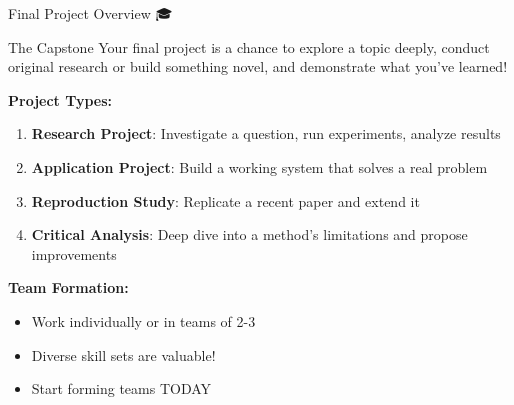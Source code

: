 \documentclass[aspectratio=169]{beamer}
\begin{document}
\begin{frame}[shrink=10]{Final Project Overview 🎓}
\begin{alertblock}{The Capstone}
Your final project is a chance to explore a topic deeply, conduct original research or build something novel, and demonstrate what you've learned!
\end{alertblock}

\vspace{0.5em}

\textbf{Project Types:}
\begin{enumerate}\setlength{\itemsep}{0pt}
    \item \textbf{Research Project}: Investigate a question, run experiments, analyze results
    \item \textbf{Application Project}: Build a working system that solves a real problem
    \item \textbf{Reproduction Study}: Replicate a recent paper and extend it
    \item \textbf{Critical Analysis}: Deep dive into a method's limitations and propose improvements
\end{enumerate}

\vspace{0.5em}

\textbf{Team Formation:}
\begin{itemize}\setlength{\itemsep}{0pt}
    \item Work individually or in teams of 2-3
    \item Diverse skill sets are valuable!
    \item Start forming teams TODAY
\end{itemize}
\end{frame}
\end{document}
